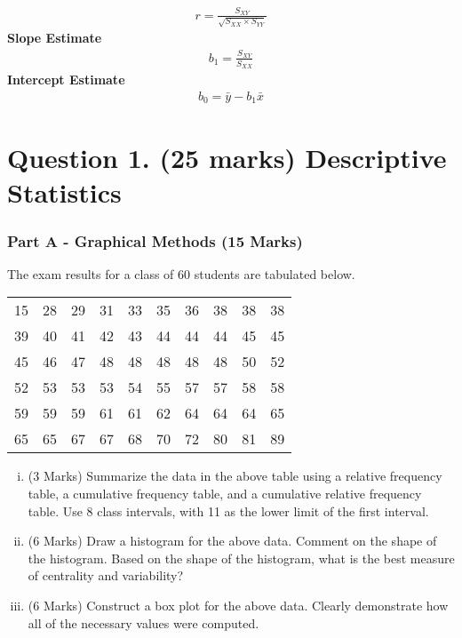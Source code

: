 \documentclass[a4paper,12pt]{article}
\begin{document}
\begin{eqnarray*}
	r = \frac{S_{XY}}{\sqrt{S_{XX} \times S_{YY}}}
\end{eqnarray*}
{\bf Slope Estimate}
\begin{eqnarray*}
	b_1 = \frac{S_{XY}}{S_{XX}}
\end{eqnarray*}
{\bf Intercept Estimate}
\begin{eqnarray*}
	b_0 = \bar{y} -b_1\bar{x}
\end{eqnarray*}



\section*{Question 1. (25 marks) Descriptive Statistics}
\subsubsection*{Part A - Graphical Methods (15 Marks)} %
The exam results for a class of 60 students are tabulated below.
\begin{table}[ht]
	\begin{center}
		\begin{tabular}{|rrrrrrrrrr|}
			\hline
			  15 &  28 &  29 &  31 &  33 &  35 &  36 &  38 &  38 &  38 \\ 
			  39 &  40 &  41 &  42 &  43 &  44 &  44 &  44 &  45 &  45 \\ 
			  45 &  46 &  47 &  48 &  48 &  48 &  48 &  48 &  50 &  52 \\ 
			  52 &  53 &  53 &  53 &  54 &  55 &  57 &  57 &  58 &  58 \\ 
			  59 &  59 &  59 &  61 &  61 &  62 &  64 &  64 &  64 &  65 \\ 
			  65 &  65 &  67 &  67 &  68 &  70 &  72 &  80 &  81 &  89 \\ 		\hline
		\end{tabular}
	\end{center}
\end{table}
\vspace{-0.5cm}
\begin{enumerate}[(i)]
	\item (3 Marks) Summarize the data in the above table using a relative frequency table, a cumulative frequency table, and a cumulative relative frequency table. Use 8 class intervals, with 11 as the lower limit of the first interval.
	\item (6 Marks) Draw a histogram for the above data. Comment on the shape of the histogram. Based on the shape of the histogram, what is the best measure of centrality and variability?
	\item (6 Marks) Construct a box plot for the above data. Clearly demonstrate how all of the necessary values were computed.
\end{enumerate}
\end{document}
